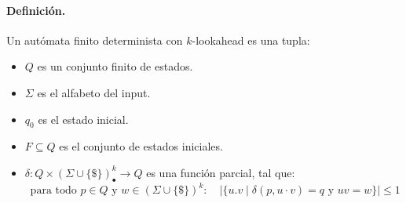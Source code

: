 \paragraph{Definición.} Un autómata finito determinista con $k$-lookahead es una tupla:
\begin{itemize}
    \item $Q$ es un conjunto finito de estados.
    \item $\Sigma$ es el alfabeto del input.
    \item $q_0$ es el estado inicial.
    \item $F \subseteq Q$ es el conjunto de estados iniciales.
    \item $\delta: Q \times(\Sigma \cup\{\mathbb{\$}\})_{\bullet}^k \rightarrow Q$ es una función parcial, tal que:
          $$
              \text { para todo } p \in Q \text { y } w \in(\Sigma \cup\{\$\})^k:\quad  |\{u . v \mid \delta(p, u \cdot v)=q \text { y } u v=w\}| \leq 1
          $$
\end{itemize}

